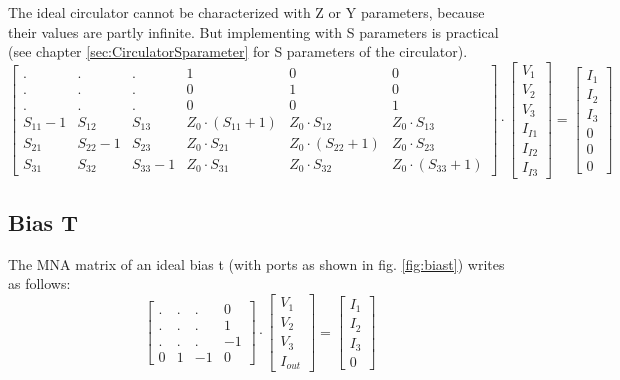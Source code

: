 The ideal circulator cannot be characterized with Z or Y parameters,
because their values are partly infinite.  But implementing with S
parameters is practical (see chapter \ref{sec:CirculatorSparameter}
for S parameters of the circulator).
\begin{equation}
\begin{bmatrix}
 . & . & .  &  1 & 0 & 0\\
 . & . & .  &  0 & 1 & 0\\
 . & . & .  &  0 & 0 & 1\\
S_{11}-1 &  S_{12} & S_{13} & Z_0\cdot (S_{11}+1) & Z_0\cdot S_{12} & Z_0\cdot S_{13}\\
S_{21} &  S_{22}-1 & S_{23} & Z_0\cdot S_{21} & Z_0\cdot (S_{22}+1) & Z_0\cdot S_{23}\\
S_{31} &  S_{32} & S_{33}-1 & Z_0\cdot S_{31} & Z_0\cdot S_{32} & Z_0\cdot (S_{33}+1)
\end{bmatrix}
\cdot
\begin{bmatrix}
V_{1}\\
V_{2}\\
V_{3}\\
I_{I1}\\
I_{I2}\\
I_{I3}
\end{bmatrix}
=
\begin{bmatrix}
I_{1}\\
I_{2}\\
I_{3}\\
0\\
0\\
0
\end{bmatrix}
\end{equation}

\subsection{Bias T}

The MNA matrix of an ideal bias t (with ports as shown in
fig. \ref{fig:biast}) writes as follows:
\begin{equation}
\begin{bmatrix}
 . & . & .  &  0\\
 . & . & .  &  1\\
 . & . & .  & -1\\
 0 & 1 & -1 &  0
\end{bmatrix}
\cdot
\begin{bmatrix}
V_{1}\\
V_{2}\\
V_{3}\\
I_{out}
\end{bmatrix}
=
\begin{bmatrix}
I_{1}\\
I_{2}\\
I_{3}\\
0
\end{bmatrix}
\end{equation}

